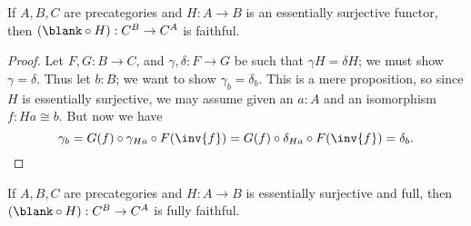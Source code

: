 \begin{lem}\label{ct:esosurj-postcomp-faithful}
  If $A,B,C$ are precategories and $H:A\to B$ is an essentially surjective functor, then $(\blank\circ H):C^B \to C^A$ is faithful.
\end{lem}
\begin{proof}
  Let $F,G:B\to C$, and $\gamma,\delta:F\to G$ be such that $\gamma H = \delta H$; we must show $\gamma=\delta$.
  Thus let $b:B$; we want to show $\gamma_b=\delta_b$.
  This is a mere proposition, so since $H$ is essentially surjective, we may assume given an $a:A$ and an isomorphism $f:Ha\cong b$.
  But now we have
  \[ \gamma_b = G(f) \circ \gamma_{Ha} \circ F(\inv{f})
  = G(f) \circ \delta_{Ha} \circ F(\inv{f})
  = \delta_b.\qedhere
  \]
\end{proof}

\begin{lem}\label{ct:esofull-precomp-ff}
  If $A,B,C$ are precategories and $H:A\to B$ is essentially surjective and full, then $(\blank\circ H):C^B \to C^A$ is fully faithful.
\end{lem}
